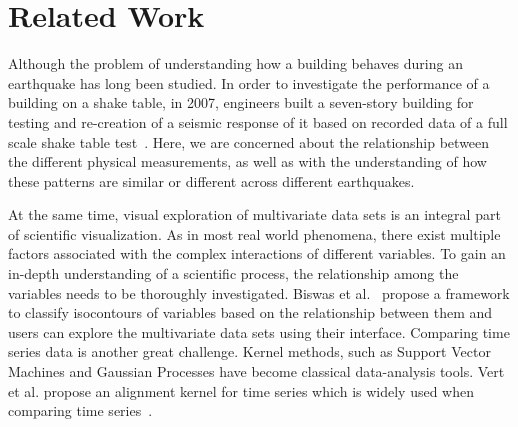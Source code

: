 \section{Related Work}
\label{sec:related}

Although the problem of understanding how a building behaves during an earthquake has long been studied.
In order to investigate the performance of a building on a shake table, in 2007, engineers built a seven-story building for testing and re-creation of a seismic response of it based on recorded data of a full scale shake table test~\cite{Chourasia:2007:DRS:1247238.1247243}. Here, we are concerned about the relationship between the different physical measurements, as well as with the understanding of how these patterns are similar or different across different earthquakes.

At the same time, visual exploration of multivariate data sets is an integral part of scientific visualization. As in most real world phenomena, there exist multiple factors associated with the complex interactions of different variables. To gain an in-depth understanding of a scientific process, the relationship among the variables needs to be thoroughly investigated. Biswas et al.~\cite{Biswas:2013:AIFEMDS:1077-2626} propose a framework to classify isocontours of variables based on the relationship between them and users can explore the multivariate data sets using their interface. Comparing time series data is another great challenge. Kernel methods, such as Support Vector Machines and Gaussian Processes have become classical data-analysis tools. Vert et al. propose an alignment kernel for time series which is widely used when comparing time series~\cite{DBLP:journals/corr/abs-cs-0610033}.


